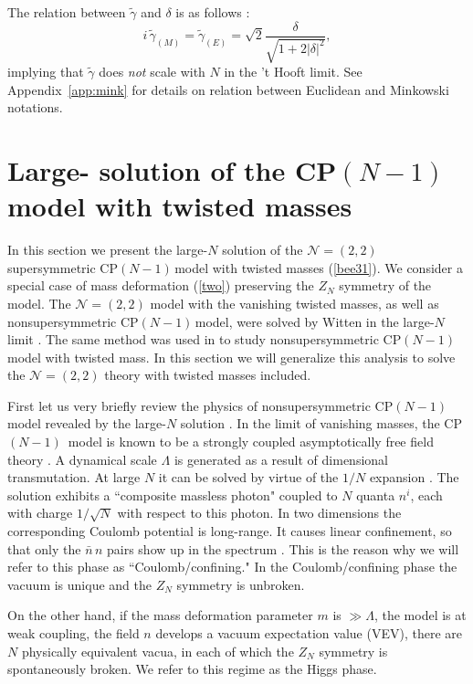 \documentclass[epsfig,12pt]{article}
\def\beq{\begin{equation}}
\def\eeq{\end{equation}}
\newcommand{\cpn}{CP$(N-1)\,$}
\def\beq{\begin{equation}}
\def\eeq{\end{equation}}
\newcommand{\ntwot}{${\mathcal N}= \left(2,2\right) $ }
\newcommand{\ssm}{{\scriptscriptstyle(M)}}
\begin{document}
The relation between $\tilde\gamma$ and $\delta$
is as follows \cite{BSY3}:
\beq
  i\,\tilde\gamma_\ssm =
     \tilde\gamma_{\scriptscriptstyle(E)} = \sqrt{2} \frac{\delta}{\sqrt{1+ 2 |\delta |^2}},
\label{tftpi4}
\eeq
implying that $\tilde \gamma$ does {\em not} scale with $N$ in the 't Hooft limit.
See Appendix~\ref{app:mink} for details on relation between Euclidean and Minkowski notations. 

\section{Large- solution
of the \cpn model with twisted masses}
\label{lnscptm}
\setcounter{equation}{0}

In this section we present the large-$N$ solution of the \ntwot supersymmetric \cpn model 
with twisted masses (\ref{bee31}). We consider a special case of mass deformation (\ref{two}) 
preserving the $Z_N$ symmetry of the model. 
The \ntwot  model with the vanishing twisted masses, as well as nonsupersymmetric \cpn model,
were solved by Witten in the large-$N$ limit \cite{W79}.
The same method was used in
\cite{GSYphtr} to study nonsupersymmetric \cpn 
model with twisted mass. In this section we will generalize this analysis 
to solve the \ntwot theory with twisted masses included. 

First let us very briefly review the physics of nonsupersymmetric \cpn model revealed
by the large-$N$ solution \cite{GSYphtr}.
In the limit of vanishing masses, the \mbox{\cpn} model is known to 
be a strongly coupled asymptotically free
field theory
\cite{BelPo}. A dynamical scale $\Lambda$ is generated as a result of
dimensional transmutation.
At large $N$ it can be solved by virtue of the $1/N$ expansion
\cite{W79}.
The solution  exhibits a ``composite massless photon"
coupled to $N$ quanta $n^i$, each with charge $1/\sqrt N$ with respect
to this photon. In two dimensions the corresponding Coulomb potential is long-range.
It causes linear confinement, so that only the $\bar n\,n$ pairs show up in the
spectrum \cite{Coleman,W79}. This is the reason why we will refer to this phase as
``Coulomb/confining." In the Coulomb/confining phase the vacuum 
is unique and the $Z_N$ symmetry is unbroken.

On the other hand, if the mass deformation parameter $m$ is $\gg\Lambda$,
the model is at weak coupling, the field $n$ develops a vacuum
expectation value (VEV),
there are $N$ physically equivalent vacua, in each of which the
$Z_N$ symmetry is spontaneously broken. We  refer to this regime
as the
Higgs phase.
\end{document}
